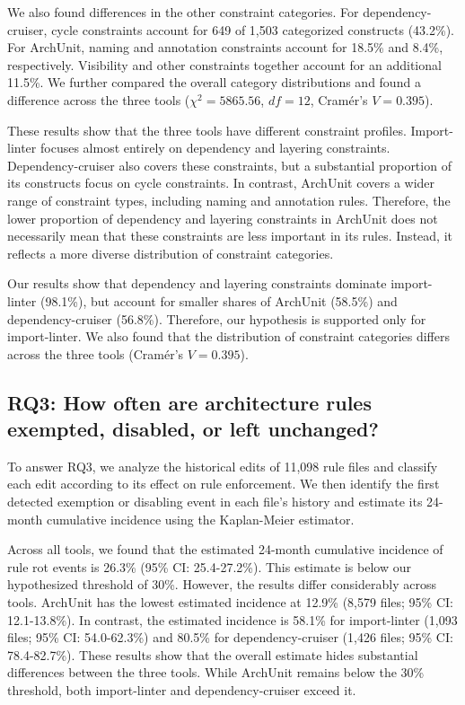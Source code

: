 We also found differences in the other constraint categories.
For dependency-cruiser, cycle constraints account for 649 of
1,503 categorized constructs (43.2\%). For ArchUnit, naming and
annotation constraints account for 18.5\% and 8.4\%,
respectively. Visibility and other constraints together account
for an additional 11.5\%. We further compared the overall category
distributions and found a difference across the three tools
($\chi^2 = 5865.56$, $df = 12$, Cram\'er's $V = 0.395$).

These results show that the three tools have different constraint
profiles. Import-linter focuses almost entirely on dependency and
layering constraints. Dependency-cruiser also covers these
constraints, but a substantial proportion of its constructs focus
on cycle constraints. In contrast, ArchUnit covers a wider range
of constraint types, including naming and annotation rules.
Therefore, the lower proportion of dependency and layering
constraints in ArchUnit does not necessarily mean that these
constraints are less important in its rules. Instead, it reflects
a more diverse distribution of constraint categories.



\begin{keyfinding}
Our results show that dependency and layering constraints
dominate import-linter (98.1\%), but account for smaller shares
of ArchUnit (58.5\%) and dependency-cruiser (56.8\%). Therefore,
our hypothesis is supported only for import-linter. We also
found that the distribution of constraint categories differs
across the three tools (Cram\'er's $V = 0.395$).
\end{keyfinding}


\subsection{RQ3: How often are architecture rules exempted, disabled, or left unchanged?}
\label{sec:rq3}

To answer RQ3, we analyze the historical edits of
11,098 rule files and classify each edit according
to its effect on rule enforcement. We then identify
the first detected exemption or disabling event
in each file's history and estimate its 24-month
cumulative incidence using the Kaplan-Meier estimator.

Across all tools, we found that the estimated 24-month cumulative incidence
of rule rot events is 26.3\% (95\% CI: 25.4-27.2\%). This estimate
is below our hypothesized threshold of 30\%. However, the
results differ considerably across tools. ArchUnit has the
lowest estimated incidence at 12.9\% (8,579 files; 95\% CI:
12.1-13.8\%). In contrast, the estimated incidence is 58.1\%
for import-linter (1,093 files; 95\% CI: 54.0-62.3\%) and
80.5\% for dependency-cruiser (1,426 files; 95\% CI:
78.4-82.7\%). These results show that the overall estimate
hides substantial differences between the three tools.
While ArchUnit remains below the 30\% threshold, both
import-linter and dependency-cruiser exceed it.

